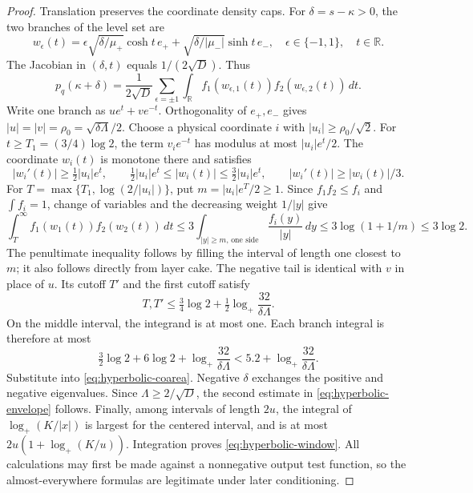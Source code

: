 \begin{proof}
Translation preserves the coordinate density caps. For $\delta=s-\kappa>0$, the two branches of the level set are
\[
 w_\epsilon(t)=\epsilon\sqrt{\delta/\mu_+}\cosh t\,e_+
       +\sqrt{\delta/|\mu_-|}\sinh t\,e_-,
 \quad \epsilon\in\{-1,1\},\quad t\in\mathbb R.
\]
The Jacobian in $(\delta,t)$ equals $1/(2\sqrt D)$. Thus
\begin{equation}\label{eq:hyperbolic-coarea}
 p_q(\kappa+\delta)=\frac1{2\sqrt D}\sum_{\epsilon=\pm1}
 \int_{\mathbb R}f_1(w_{\epsilon,1}(t))f_2(w_{\epsilon,2}(t))\,dt.
\end{equation}
Write one branch as $u e^t+v e^{-t}$. Orthogonality of $e_+,e_-$ gives
$|u|=|v|=\rho_0=\sqrt{\delta\Lambda}/2$. Choose a physical coordinate $i$ with $|u_i|\ge\rho_0/\sqrt2$. For $t\ge T_1=(3/4)\log2$, the term $v_i e^{-t}$ has modulus at most $|u_i|e^t/2$. The coordinate $w_i(t)$ is monotone there and satisfies
\[
 |w_i'(t)|\ge\tfrac12|u_i|e^t,\qquad
 \tfrac12|u_i|e^t\le|w_i(t)|\le\tfrac32|u_i|e^t,
 \qquad |w_i'(t)|\ge |w_i(t)|/3.
\]
For $T=\max\{T_1,\log(2/|u_i|)\}$, put $m=|u_i|e^T/2\ge1$. Since $f_1f_2\le f_i$ and $\int f_i=1$, change of variables and the decreasing weight $1/|y|$ give
\[
 \int_T^\infty f_1(w_1(t))f_2(w_2(t))\,dt
 \le3\int_{|y|\ge m,\,\text{one side}}\frac{f_i(y)}{|y|}\,dy
 \le3\log(1+1/m)\le3\log2.
\]
The penultimate inequality follows by filling the interval of length one closest to $m$; it also follows directly from layer cake. The negative tail is identical with $v$ in place of $u$. Its cutoff $T'$ and the first cutoff satisfy
\[
 T,T'\le\tfrac34\log2+\tfrac12\log_+\frac{32}{\delta\Lambda}.
\]
On the middle interval, the integrand is at most one. Each branch integral is therefore at most
\[
 \tfrac32\log2+6\log2+\log_+\frac{32}{\delta\Lambda}
 <5.2+\log_+\frac{32}{\delta\Lambda}.
\]
Substitute into \eqref{eq:hyperbolic-coarea}. Negative $\delta$ exchanges the positive and negative eigenvalues. Since $\Lambda\ge2/\sqrt D$, the second estimate in \eqref{eq:hyperbolic-envelope} follows. Finally, among intervals of length $2u$, the integral of $\log_+(K/|x|)$ is largest for the centered interval, and is at most $2u(1+\log_+(K/u))$. Integration proves \eqref{eq:hyperbolic-window}. All calculations may first be made against a nonnegative output test function, so the almost-everywhere formulas are legitimate under later conditioning.
\end{proof}

